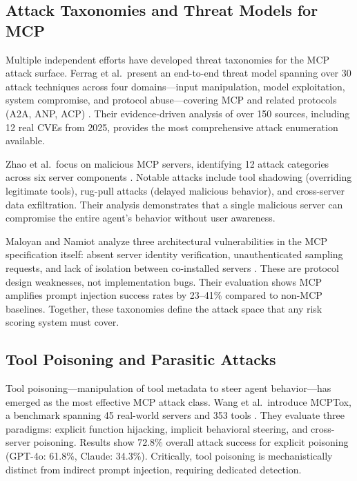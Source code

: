 \documentclass[12pt]{article}
\begin{document}
\subsection{Attack Taxonomies and Threat Models for MCP}

Multiple independent efforts have developed threat taxonomies for the MCP attack surface. Ferrag et al.\ present an end-to-end threat model spanning over 30 attack techniques across four domains---input manipulation, model exploitation, system compromise, and protocol abuse---covering MCP and related protocols (A2A, ANP, ACP) \cite{ferrag2025prompt_to_protocol}. Their evidence-driven analysis of over 150 sources, including 12 real CVEs from 2025, provides the most comprehensive attack enumeration available.

Zhao et al.\ focus on malicious MCP servers, identifying 12 attack categories across six server components \cite{zhao2025when_mcp_servers_attack}. Notable attacks include tool shadowing (overriding legitimate tools), rug-pull attacks (delayed malicious behavior), and cross-server data exfiltration. Their analysis demonstrates that a single malicious server can compromise the entire agent’s behavior without user awareness.

Maloyan and Namiot analyze three architectural vulnerabilities in the MCP specification itself: absent server identity verification, unauthenticated sampling requests, and lack of isolation between co-installed servers \cite{maloyan2026breaking_protocol}. These are protocol design weaknesses, not implementation bugs. Their evaluation shows MCP amplifies prompt injection success rates by 23--41\% compared to non-MCP baselines. Together, these taxonomies define the attack space that any risk scoring system must cover.

\subsection{Tool Poisoning and Parasitic Attacks}

Tool poisoning---manipulation of tool metadata to steer agent behavior---has emerged as the most effective MCP attack class. Wang et al.\ introduce MCPTox, a benchmark spanning 45 real-world servers and 353 tools \cite{wang2025mcptox}. They evaluate three paradigms: explicit function hijacking, implicit behavioral steering, and cross-server poisoning. Results show 72.8\% overall attack success for explicit poisoning (GPT-4o: 61.8\%, Claude: 34.3\%). Critically, tool poisoning is mechanistically distinct from indirect prompt injection, requiring dedicated detection.
\end{document}
